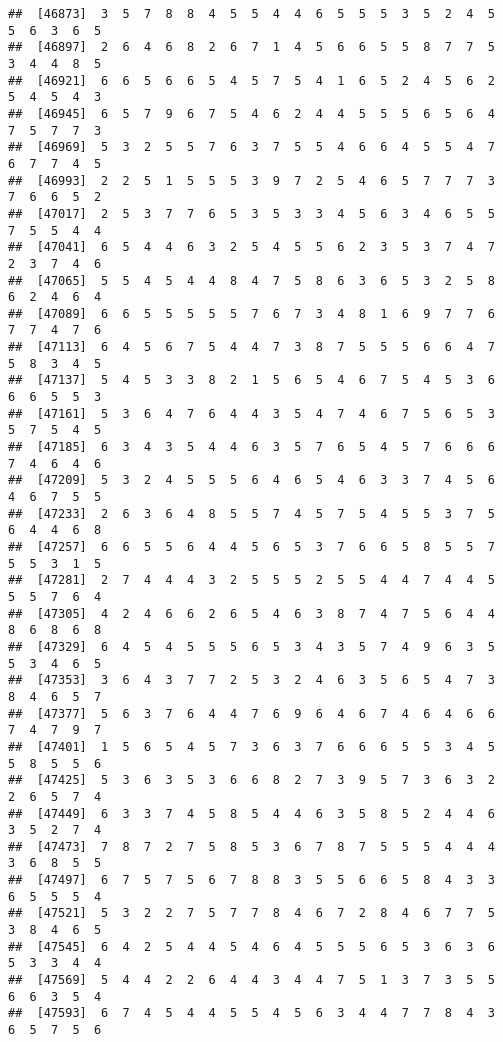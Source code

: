 \documentclass[
]{book}
\begin{document}
\begin{verbatim}
##  [46873]  3  5  7  8  8  4  5  5  4  4  6  5  5  5  3  5  2  4  5  5  6  3  6  5
##  [46897]  2  6  4  6  8  2  6  7  1  4  5  6  6  5  5  8  7  7  5  3  4  4  8  5
##  [46921]  6  6  5  6  6  5  4  5  7  5  4  1  6  5  2  4  5  6  2  5  4  5  4  3
##  [46945]  6  5  7  9  6  7  5  4  6  2  4  4  5  5  5  6  5  6  4  7  5  7  7  3
##  [46969]  5  3  2  5  5  7  6  3  7  5  5  4  6  6  4  5  5  4  7  6  7  7  4  5
##  [46993]  2  2  5  1  5  5  5  3  9  7  2  5  4  6  5  7  7  7  3  7  6  6  5  2
##  [47017]  2  5  3  7  7  6  5  3  5  3  3  4  5  6  3  4  6  5  5  7  5  5  4  4
##  [47041]  6  5  4  4  6  3  2  5  4  5  5  6  2  3  5  3  7  4  7  2  3  7  4  6
##  [47065]  5  5  4  5  4  4  8  4  7  5  8  6  3  6  5  3  2  5  8  6  2  4  6  4
##  [47089]  6  6  5  5  5  5  5  7  6  7  3  4  8  1  6  9  7  7  6  7  7  4  7  6
##  [47113]  6  4  5  6  7  5  4  4  7  3  8  7  5  5  5  6  6  4  7  5  8  3  4  5
##  [47137]  5  4  5  3  3  8  2  1  5  6  5  4  6  7  5  4  5  3  6  6  6  5  5  3
##  [47161]  5  3  6  4  7  6  4  4  3  5  4  7  4  6  7  5  6  5  3  5  7  5  4  5
##  [47185]  6  3  4  3  5  4  4  6  3  5  7  6  5  4  5  7  6  6  6  7  4  6  4  6
##  [47209]  5  3  2  4  5  5  5  6  4  6  5  4  6  3  3  7  4  5  6  4  6  7  5  5
##  [47233]  2  6  3  6  4  8  5  5  7  4  5  7  5  4  5  5  3  7  5  6  4  4  6  8
##  [47257]  6  6  5  5  6  4  4  5  6  5  3  7  6  6  5  8  5  5  7  5  5  3  1  5
##  [47281]  2  7  4  4  4  3  2  5  5  5  2  5  5  4  4  7  4  4  5  5  5  7  6  4
##  [47305]  4  2  4  6  6  2  6  5  4  6  3  8  7  4  7  5  6  4  4  8  6  8  6  8
##  [47329]  6  4  5  4  5  5  5  6  5  3  4  3  5  7  4  9  6  3  5  5  3  4  6  5
##  [47353]  3  6  4  3  7  7  2  5  3  2  4  6  3  5  6  5  4  7  3  8  4  6  5  7
##  [47377]  5  6  3  7  6  4  4  7  6  9  6  4  6  7  4  6  4  6  6  7  4  7  9  7
##  [47401]  1  5  6  5  4  5  7  3  6  3  7  6  6  6  5  5  3  4  5  5  8  5  5  6
##  [47425]  5  3  6  3  5  3  6  6  8  2  7  3  9  5  7  3  6  3  2  2  6  5  7  4
##  [47449]  6  3  3  7  4  5  8  5  4  4  6  3  5  8  5  2  4  4  6  3  5  2  7  4
##  [47473]  7  8  7  2  7  5  8  5  3  6  7  8  7  5  5  5  4  4  4  3  6  8  5  5
##  [47497]  6  7  5  7  5  6  7  8  8  3  5  5  6  6  5  8  4  3  3  6  5  5  5  4
##  [47521]  5  3  2  2  7  5  7  7  8  4  6  7  2  8  4  6  7  7  5  3  8  4  6  5
##  [47545]  6  4  2  5  4  4  5  4  6  4  5  5  5  6  5  3  6  3  6  5  3  3  4  4
##  [47569]  5  4  4  2  2  6  4  4  3  4  4  7  5  1  3  7  3  5  5  6  6  3  5  4
##  [47593]  6  7  4  5  4  4  5  5  4  5  6  3  4  4  7  7  8  4  3  6  5  7  5  6

\end{verbatim}
\end{document}
